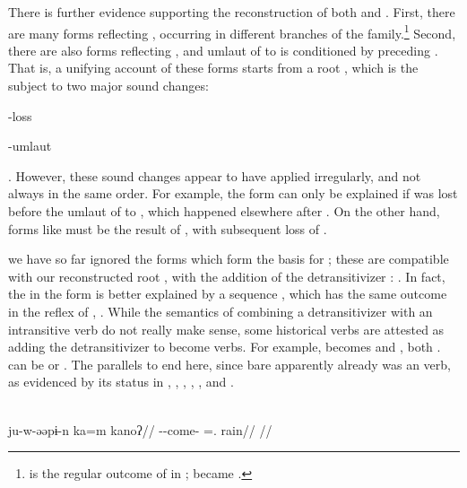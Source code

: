 There is further evidence supporting the reconstruction of both  and .
First, there are many forms reflecting \colorbox{come2}{}, occurring in different branches of the family.\footnote{ is the regular outcome of  in \uxc;  became  \parencite[176]{meira2005southern}.}
Second, there are also forms reflecting \colorbox{come3}{}, and umlaut of  to  is conditioned by preceding  \parencite{meira2010origin}.
That is, a unifying account of these forms starts from a root , which is the subject to two major sound changes: \begin{inlinelist}
 \item {}-loss
 \item {}-umlaut	
 \end{inlinelist}.
However, these sound changes appear to have applied irregularly, and not always in the same order.
For example, the \kalina form  can only be explained if  was lost before the umlaut of  to , which happened elsewhere after .
On the other hand, forms like \maqui {} must be the result of , with subsequent loss of .

we have so far ignored the forms which form the basis for  ; these are compatible with our reconstructed root , with the addition of the detransitivizer : \colorbox{come4}{}.
In fact, the  in the \akawaio form  is better explained by a sequence , which has the same outcome  in the \macushi reflex of , .
While the semantics of combining a detransitivizer with an intransitive verb do not really make sense, some historical  verbs are attested as adding the detransitivizer to become  verbs.
For example,    becomes \trio {} \parencite[252]{triomeira1999} and \kalina {} \parencite[429]{courtz2008carib}, both .
\waiwai {} can be  \parencite[30]{waiwaihawkins1998} or  \parencite[204]{hawkins1953waiwai}.
The parallels to  end here, since bare   apparently already was an  verb, as evidenced by its status in \kaxui, \kalina, \panare {}, \arara, \trio, and \akuriyo.

\panare \parencite[][65]{panarepayne2013}\\
\begingl
\gla ju-w-əəpɨ-n ka=m kanoʔ//
\glb {}--come- =. rain//
\glft {}//
\endgl
\xe

